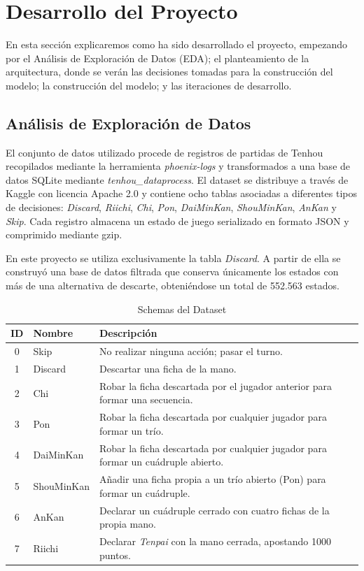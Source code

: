 \section{Desarrollo del Proyecto}

En esta sección explicaremos como ha sido desarrollado el proyecto, empezando por el Análisis de Exploración de Datos (EDA); el planteamiento de la arquitectura, donde se verán las decisiones tomadas para la construcción del modelo; la construcción del modelo; y las iteraciones de desarrollo.

\subsection{Análisis de Exploración de Datos}

El conjunto de datos utilizado procede de registros de partidas de Tenhou recopilados mediante la herramienta \textit{phoenix-logs} y transformados a una base de datos SQLite mediante \textit{tenhou\_dataprocess}. El dataset se distribuye a través de Kaggle con licencia Apache 2.0 y contiene ocho tablas asociadas a diferentes tipos de decisiones: \textit{Discard}, \textit{Riichi}, \textit{Chi}, \textit{Pon}, \textit{DaiMinKan}, \textit{ShouMinKan}, \textit{AnKan} y \textit{Skip}. Cada registro almacena un estado de juego serializado en formato JSON y comprimido mediante gzip.

En este proyecto se utiliza exclusivamente la tabla \textit{Discard}. A partir de ella se construyó una base de datos filtrada que conserva únicamente los estados con más de una alternativa de descarte, obteniéndose un total de 552.563 estados.

\begin{table}[H]
  \centering
  \caption{Schemas del Dataset}
  \label{tab:schemas}
  \begin{tabular}{@{}cll@{}}
    \toprule
    \textbf{ID} & \textbf{Nombre} & \textbf{Descripción} \\
    \midrule
    0 & Skip        & No realizar ninguna acción; pasar el turno. \\
    1 & Discard     & Descartar una ficha de la mano. \\
    2 & Chi         & Robar la ficha descartada por el jugador anterior para formar una secuencia. \\
    3 & Pon         & Robar la ficha descartada por cualquier jugador para formar un trío. \\
    4 & DaiMinKan   & Robar la ficha descartada por cualquier jugador para formar un cuádruple abierto. \\
    5 & ShouMinKan  & Añadir una ficha propia a un trío abierto (Pon) para formar un cuádruple. \\
    6 & AnKan       & Declarar un cuádruple cerrado con cuatro fichas de la propia mano. \\
    7 & Riichi      & Declarar \textit{Tenpai} con la mano cerrada, apostando 1000 puntos. \\
    \bottomrule
  \end{tabular}
\end{table}


